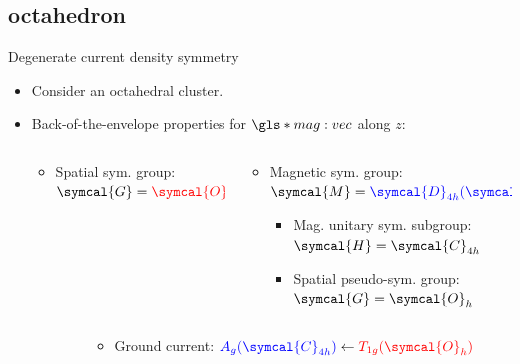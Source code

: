   \subsection{ octahedron}
  \begin{frame}{Degenerate current density symmetry}
    \begin{itemize}
      \item<1-> Consider an octahedral  cluster.
      \begin{figure}
        \centering
        \scalebox{.8}{}
      \end{figure}

      \item<1-> Back-of-the-envelope properties for $\gls*{mag:vec}$ along $z$:
      \begin{columns}[T]
        \begin{column}{.40\textwidth}
          \begin{itemize}
            \item<1-> Spatial sym. group: $\symcal{G} = \textcolor{red}{\symcal{O}_{h}}$
          \end{itemize}
        \end{column}
        \begin{column}{.50\textwidth}
          \begin{itemize}
            \item<1-> Magnetic sym. group: $\symcal{M} = \textcolor{blue}{\symcal{D}_{4h}(\symcal{C}_{4h})}$
            \begin{itemize}
              \item Mag. unitary sym. subgroup: $\symcal{H} = \symcal{C}_{4h}$
              \item Spatial pseudo-sym. group: $\symcal{G} = \symcal{O}_{h}$
            \end{itemize}
          \end{itemize}
        \end{column}
      \end{columns}

      \vspace{6pt}

      \begin{columns}[T]
        \begin{column}{.40\textwidth}
        \end{column}
        \begin{column}{.50\textwidth}
          \begin{itemize}
            \item<1-> Ground current: $\textcolor{blue}{A_g(\symcal{C}_{4h})} \leftarrow \textcolor{red}{T_{1g}(\symcal{O}_{h})}$
          \end{itemize}
        \end{column}
      \end{columns}
    \end{itemize}
  \end{frame}


